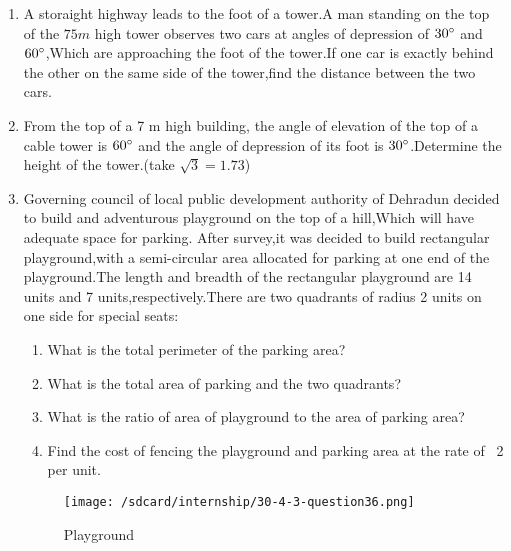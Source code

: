 \documentclass{article}
\begin{document}
\begin{enumerate}
\begin{enumerate}
            \end{enumerate}
    \item A storaight highway leads to the foot of a tower.A man standing on the top of the $75 m$ high tower observes two cars at angles of depression of $30\degree$ and $60\degree$,Which are approaching the foot of the tower.If one car is exactly behind the other on the same side of the tower,find the distance between the two cars.\\
    \item From the top of a 7 m high building, the angle of elevation of the top of a cable tower is $60\degree$ and the angle of depression of its foot is $30\degree$.Determine the height of the tower.(take $\sqrt{3}=1.73$)\\
    \item Governing council of local public development authority of Dehradun decided to build and adventurous playground on the top of a hill,Which will have adequate space for parking.
    After survey,it was decided to build rectangular playground,with a semi-circular area allocated for parking at one end of the playground.The length and breadth of the rectangular playground are 14 units and 7 units,respectively.There are two quadrants of radius 2 units on one side for special seats:\\
            \begin{enumerate}
                \item What is the total perimeter of the parking area?\\
                \item What is the total area of parking and the two quadrants?\\
                \item What is the ratio of area of playground to the area of parking area?\\
                \item Find the cost of fencing the playground and parking area at the rate of \rupee~2 per unit.
            \end{enumerate}
    \begin{figure}[h]
    \centering
    \texttt{[image: /sdcard/internship/30-4-3-question36.png]}\\
    \caption{Playground}
    \label{}
    \end{figure}
\end{enumerate}
\end{document}
